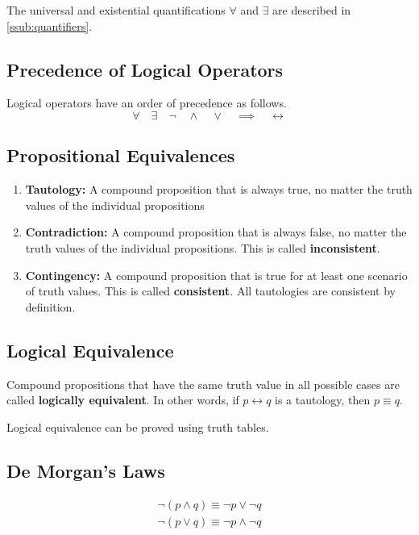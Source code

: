 The universal and existential quantifications \( \forall \) and \( \exists \) are described in \autoref{ssub:quantifiers}.

\subsection{Precedence of Logical Operators}
Logical operators have an order of precedence as follows. \[
\forall \quad \exists \quad \neg \quad \wedge \quad \vee \quad \implies \quad \leftrightarrow
\]
\subsection{Propositional Equivalences}\label{ssec:equiv}
\begin{enumerate}
	\item \textbf{Tautology:} A compound proposition that is always true, no matter the truth values of the individual propositions
	\item \textbf{Contradiction:} A compound proposition that is always false, no matter the truth values of the individual propositions. This is called \textbf{inconsistent}.
	\item \textbf{Contingency:} A compound proposition that is true for at least one scenario of truth values. This is called \textbf{consistent}. All tautologies are consistent by definition.
\end{enumerate}


\subsection{Logical Equivalence}
Compound propositions that have the same truth value in all possible cases are called \textbf{logically equivalent}. In other words, if \(p \leftrightarrow q\) is a tautology, then \(p \equiv q\).

Logical equivalence can be proved using truth tables.

\subsection{De Morgan's Laws}
\begin{gather*}
\neg (p \wedge q) \equiv \neg p \vee \neg q  \tag{De Morgan's First Law} \\
\neg (p \vee q) \equiv \neg p \wedge \neg q \tag{De Morgan's Second Law}
\end{gather*}
